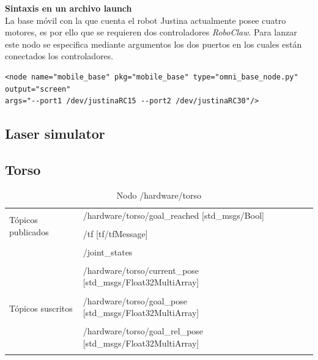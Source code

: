 \documentclass[a4paper,usenames,dvipsnames,svgnames,table]{book}
\begin{document}
\textbf{Sintaxis en un archivo launch}\\
La base móvil con la que cuenta el robot Justina actualmente posee cuatro motores, es por ello que se requieren dos controladores \textit{RoboClaw}. Para lanzar este nodo se especifica mediante argumentos los dos puertos en los cuales están conectados los controladores.\\
\begin{verbatim}
<node name="mobile_base" pkg="mobile_base" type="omni_base_node.py" output="screen" 
args="--port1 /dev/justinaRC15 --port2 /dev/justinaRC30"/>
\end{verbatim}

\subsection{Laser simulator}

\subsection{Torso}

\begin{table}[H]
\begin{center}
\begin{tabular}{|l|p{6cm}|p{5cm}|}%
\hline

\multirow{4}{*}{Tópicos publicados}
& /hardware/torso/goal\_reached [std\_msgs/Bool] &  \\
& & \\
& /tf [tf/tfMessage] &  \\
& & \\
& /joint\_states  &  \\
& & \\
& /hardware/torso/current\_pose [std\_msgs/Float32MultiArray] &  \\
& & \\
\cline{1-3}

\multirow{2}{*}{Tópicos suscritos}
& /hardware/torso/goal\_pose [std\_msgs/Float32MultiArray] &  \\
& & \\
& /hardware/torso/goal\_rel\_pose [std\_msgs/Float32MultiArray] &  \\
& & \\
\cline{1-3} 

\end{tabular}
\caption{Nodo /hardware/torso}
\label{torso node}
\end{center}
\end{table}
\end{document}
